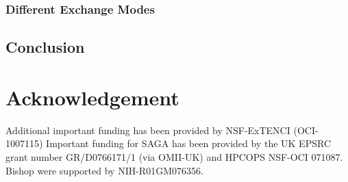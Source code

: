 \documentclass{sig-alternate}
\begin{document}
\subsubsection{Different Exchange Modes}


\subsection{Conclusion}



\section*{Acknowledgement}
\footnotesize{Additional important
  funding has been provided by NSF-ExTENCI (OCI-1007115) Important
  funding for SAGA has been provided by the UK EPSRC grant number
  GR/D0766171/1 (via OMII-UK) and HPCOPS NSF-OCI 071087. Bishop were
  supported by NIH-R01GM076356.}


%
%
\end{document}
